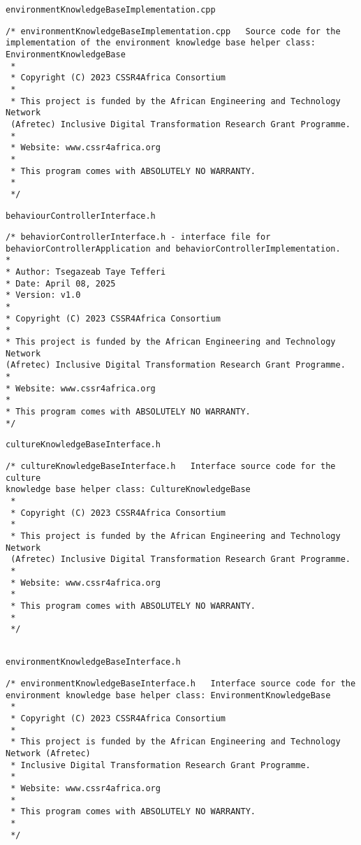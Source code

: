 \documentclass{CSSRforAfrica}
\newcommand{\blank}{~\\}
\newcommand{\checkboxChecked}{\fbox{\ding{51}}} %
\begin{document}
\begin{description}
{\begin{verbatim}
\end{verbatim} }

\item[\checkboxChecked]  {\small \verb+environmentKnowledgeBaseImplementation.cpp+}  
{\small \begin{verbatim}
/* environmentKnowledgeBaseImplementation.cpp   Source code for the 
implementation of the environment knowledge base helper class: 
EnvironmentKnowledgeBase
 *
 * Copyright (C) 2023 CSSR4Africa Consortium
 *
 * This project is funded by the African Engineering and Technology Network 
 (Afretec) Inclusive Digital Transformation Research Grant Programme.
 *
 * Website: www.cssr4africa.org
 *
 * This program comes with ABSOLUTELY NO WARRANTY.
 *
 */
\end{verbatim} }


\item[\checkboxChecked] {\small \verb+behaviourControllerInterface.h+}   
{\small \begin{verbatim}
/* behaviorControllerInterface.h - interface file for 
behaviorControllerApplication and behaviorControllerImplementation.
*
* Author: Tsegazeab Taye Tefferi
* Date: April 08, 2025
* Version: v1.0
*
* Copyright (C) 2023 CSSR4Africa Consortium
*
* This project is funded by the African Engineering and Technology Network 
(Afretec) Inclusive Digital Transformation Research Grant Programme.
*
* Website: www.cssr4africa.org
*
* This program comes with ABSOLUTELY NO WARRANTY.
*/
\end{verbatim} }

\item[\checkboxChecked] {\small \verb+cultureKnowledgeBaseInterface.h+}   
{\small \begin{verbatim}
/* cultureKnowledgeBaseInterface.h   Interface source code for the culture 
knowledge base helper class: CultureKnowledgeBase
 *
 * Copyright (C) 2023 CSSR4Africa Consortium
 *
 * This project is funded by the African Engineering and Technology Network 
 (Afretec) Inclusive Digital Transformation Research Grant Programme.
 *
 * Website: www.cssr4africa.org
 *
 * This program comes with ABSOLUTELY NO WARRANTY.
 *
 */
 
\end{verbatim} }

\item[\checkboxChecked] {\small \verb+environmentKnowledgeBaseInterface.h+}   
{\small \begin{verbatim}
/* environmentKnowledgeBaseInterface.h   Interface source code for the 
environment knowledge base helper class: EnvironmentKnowledgeBase
 *
 * Copyright (C) 2023 CSSR4Africa Consortium
 *
 * This project is funded by the African Engineering and Technology Network (Afretec)
 * Inclusive Digital Transformation Research Grant Programme.
 *
 * Website: www.cssr4africa.org
 *
 * This program comes with ABSOLUTELY NO WARRANTY.
 *
 */
\end{verbatim} }

\end{description} 
%
\end{document}
